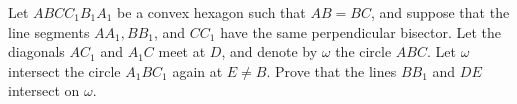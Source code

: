 Let 
$ABCC_1B_1A_1$
 be a convex hexagon such that 
$AB=BC$,
 and suppose that the line segments 
$AA_1, BB_1$,
 and 
$CC_1$
 have the same perpendicular bisector. Let the diagonals 
$AC_1$
 and 
$A_1C$
 meet at 
$D$,
 and denote by 
$\omega$
 the circle 
$ABC$.
 Let 
$\omega$
 intersect the circle 
$A_1BC_1$
 again at 
$E \neq B$.
 Prove that the lines 
$BB_1$
 and 
$DE$
 intersect on 
$\omega$.
